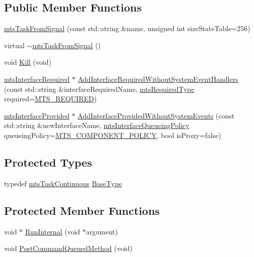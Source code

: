 \subsection*{Public Member Functions}
\begin{DoxyCompactItemize}
\item 
\hyperlink{classmts_task_from_signal_a6a5603846ff3b161a939aee0ba766350}{mts\-Task\-From\-Signal} (const std\-::string \&name, unsigned int size\-State\-Table=256)
\item 
virtual \hyperlink{classmts_task_from_signal_a4bdd61afb997d0c2e1da6697de1650a5}{$\sim$mts\-Task\-From\-Signal} ()
\item 
void \hyperlink{classmts_task_from_signal_a9a1b6e7c80ca2c2fdc14de78e3635922}{Kill} (void)
\item 
\hyperlink{classmts_interface_required}{mts\-Interface\-Required} $\ast$ \hyperlink{classmts_task_from_signal_ab3cec57b1aa96bb362249da1619c70da}{Add\-Interface\-Required\-Without\-System\-Event\-Handlers} (const std\-::string \&interface\-Required\-Name, \hyperlink{mts_forward_declarations_8h_a9ef1ce54724afde7802db326ff8606f3}{mts\-Required\-Type} required=\hyperlink{mts_forward_declarations_8h_a9ef1ce54724afde7802db326ff8606f3ae01fd85391b60e546bbb1be9716c4ec9}{M\-T\-S\-\_\-\-R\-E\-Q\-U\-I\-R\-E\-D})
\item 
\hyperlink{classmts_interface_provided}{mts\-Interface\-Provided} $\ast$ \hyperlink{classmts_task_from_signal_a3c970338699b4f96c81382af821ed8fd}{Add\-Interface\-Provided\-Without\-System\-Events} (const std\-::string \&new\-Interface\-Name, \hyperlink{mts_forward_declarations_8h_abedfb5c45b329a89b0fb647a96a7c938}{mts\-Interface\-Queueing\-Policy} queueing\-Policy=\hyperlink{mts_forward_declarations_8h_abedfb5c45b329a89b0fb647a96a7c938aff70a768b1fb65f10206583efbad12bb}{M\-T\-S\-\_\-\-C\-O\-M\-P\-O\-N\-E\-N\-T\-\_\-\-P\-O\-L\-I\-C\-Y}, bool is\-Proxy=false)
\end{DoxyCompactItemize}
\subsection*{Protected Types}
\begin{DoxyCompactItemize}
\item 
typedef \hyperlink{classmts_task_continuous}{mts\-Task\-Continuous} \hyperlink{classmts_task_from_signal_a5c3a0b848b74c8eb4d9847161a2f1cff}{Base\-Type}
\end{DoxyCompactItemize}
\subsection*{Protected Member Functions}
\begin{DoxyCompactItemize}
\item 
void $\ast$ \hyperlink{classmts_task_from_signal_a8bdcd5913b1e3928d3dbc08a96f3fe65}{Run\-Internal} (void $\ast$argument)
\item 
void \hyperlink{classmts_task_from_signal_a486fab1fb4ea5d75d53dcd49509f322d}{Post\-Command\-Queued\-Method} (void)
\end{DoxyCompactItemize}
